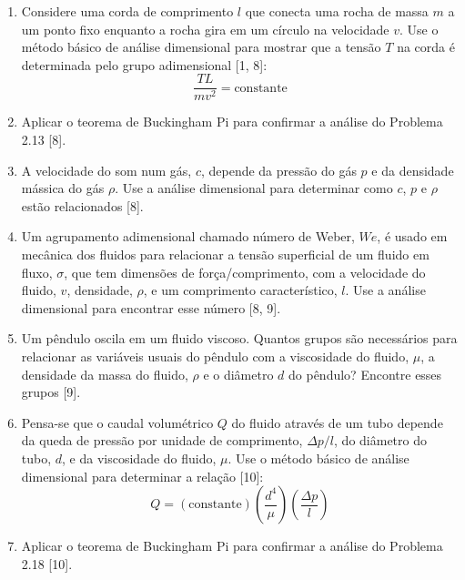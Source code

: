 \begin{enumerate}
    \item[\textbf{Problema 2.13.}] Considere uma corda de comprimento $l$ que conecta uma rocha de massa $m$ a um ponto fixo enquanto a rocha gira em um círculo na velocidade $v$. Use o método básico de análise dimensional para mostrar que a tensão $T$ na corda é determinada pelo grupo adimensional [1, 8]:
    \begin{equation}
        \frac{TL}{m v^2} = \text{constante}
    \end{equation}

    \item[\textbf{Problema 2.14.}] Aplicar o teorema de Buckingham Pi para confirmar a análise do Problema 2.13 [8].

    \item[\textbf{Problema 2.15.}] A velocidade do som num gás, $c$, depende da pressão do gás $p$ e da densidade mássica do gás $\rho$. Use a análise dimensional para determinar como $c$, $p$ e $\rho$ estão relacionados [8].

    \item[\textbf{Problema 2.16.}] Um agrupamento adimensional chamado número de Weber, $We$, é usado em mecânica dos fluidos para relacionar a tensão superficial de um fluido em fluxo, $\sigma$, que tem dimensões de força/comprimento, com a velocidade do fluido, $v$, densidade, $\rho$, e um comprimento característico, $l$. Use a análise dimensional para encontrar esse número [8, 9].

    \item[\textbf{Problema 2.17.}] Um pêndulo oscila em um fluido viscoso. Quantos grupos são necessários para relacionar as variáveis usuais do pêndulo com a viscosidade do fluido, $\mu$, a densidade da massa do fluido, $\rho$ e o diâmetro $d$ do pêndulo? Encontre esses grupos [9].

    \item[\textbf{Problema 2.18.}] Pensa-se que o caudal volumétrico $Q$ do fluido através de um tubo depende da queda de pressão por unidade de comprimento, $\Delta p / l$, do diâmetro do tubo, $d$, e da viscosidade do fluido, $\mu$. Use o método básico de análise dimensional para determinar a relação [10]:
    \begin{equation}
        Q = (\text{constante}) \left(\frac{d^4}{\mu}\right) \left(\frac{\Delta p}{l}\right)
    \end{equation}

    \item[\textbf{Problema 2.19.}] Aplicar o teorema de Buckingham Pi para confirmar a análise do Problema 2.18 [10].


\end{enumerate}
